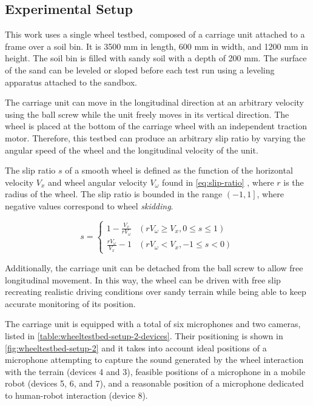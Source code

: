 \subsection{Experimental Setup} \label{subsec:experimental-setup}

This work uses a single wheel testbed, composed of a carriage unit attached to
a frame over a soil bin. It is 3500 mm in length, 600 mm in width, and 1200 mm
in height. The soil bin is filled with sandy soil with a depth of 200 mm. The
surface of the sand can be leveled or sloped before each test run using a
leveling apparatus attached to the sandbox.

The carriage unit can move in the longitudinal direction at an arbitrary
velocity using the ball screw while the unit freely moves in its vertical
direction. The wheel is placed at the bottom of the carriage wheel with an
independent traction motor. Therefore, this testbed can produce an arbitrary
slip ratio by varying the angular speed of the wheel and the longitudinal
velocity of the unit. 

The slip ratio $s$ of a smooth wheel is defined as the function of the
horizontal velocity $V_x$ and wheel angular velocity $V_\omega$ found in
\cref{eq:slip-ratio} \cite{Slip2009}, where $r$ is the radius of the wheel. The
slip ratio is bounded in the range $\left(-1,1\right]$, where negative values
correspond to wheel \emph{skidding}.

\begin{equation}
    s  = \begin{cases} 
        1 - \frac{V_x}{r V_\omega} & (r V_\omega \geq V_x, 0 \leq s \leq 1) \\
        \frac{r V_\omega}{V_x} - 1 & (r V_\omega < V_x, -1 \leq s < 0)
    \end{cases}
    \label{eq:slip-ratio}
\end{equation}

Additionally, the carriage unit can be detached from the ball screw to allow
free longitudinal movement. In this way, the wheel can be driven with free slip
recreating realistic driving conditions over sandy terrain while being able to
keep accurate monitoring of its position.

The carriage unit is equipped with a total of six microphones and two cameras,
listed in \cref{table:wheeltestbed-setup-2-devices}. Their positioning is shown
in \cref{fig:wheeltestbed-setup-2} and it  takes into account ideal positions
of a microphone attempting to capture the sound generated by the wheel
interaction with the terrain (devices 4 and 3), feasible positions of a
microphone in a mobile robot (devices 5, 6, and 7), and a reasonable position
of a microphone dedicated to human-robot interaction (device 8).

